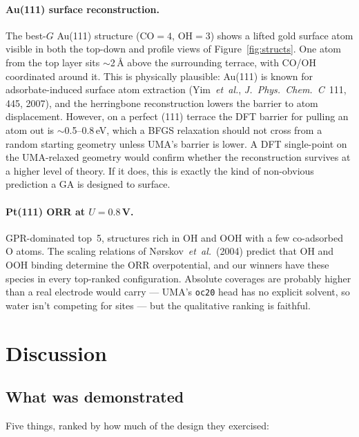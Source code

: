 \documentclass[11pt,letterpaper]{article}
\begin{document}
\paragraph{Au(111) surface reconstruction.} The best-$G$ Au(111)
structure (CO$=4$, OH$=3$) shows a lifted gold surface atom visible
in both the top-down and profile views of Figure~\ref{fig:structs}.
One atom from the top layer sits $\sim$2\,\AA{} above the
surrounding terrace, with CO/OH coordinated around it. This is
physically plausible: Au(111) is known for adsorbate-induced surface
atom extraction (Yim~\emph{et~al.}, \emph{J.~Phys.~Chem.~C}~111,
445, 2007), and the herringbone reconstruction lowers the barrier to
atom displacement. However, on a perfect (111) terrace the DFT
barrier for pulling an atom out is $\sim$0.5--0.8\,eV, which a BFGS
relaxation should not cross from a random starting geometry unless
UMA's barrier is lower. A DFT single-point on the UMA-relaxed
geometry would confirm whether the reconstruction survives at a
higher level of theory. If it does, this is exactly the kind of
non-obvious prediction a GA is designed to surface.

\paragraph{Pt(111) ORR at $U=0.8$\,V.} GPR-dominated top~5,
structures rich in OH and OOH with a few co-adsorbed O atoms. The
scaling relations of N{\o}rskov~\emph{et~al.}~(2004) predict that OH
and OOH binding determine the ORR overpotential, and our winners have
these species in every top-ranked configuration. Absolute coverages
are probably higher than a real electrode would carry — UMA's
\texttt{oc20} head has no explicit solvent, so water isn't competing
for sites — but the qualitative ranking is faithful.

\section{Discussion}
\label{sec:discuss}

\subsection{What was demonstrated}

Five things, ranked by how much of the design they exercised:
\end{document}
